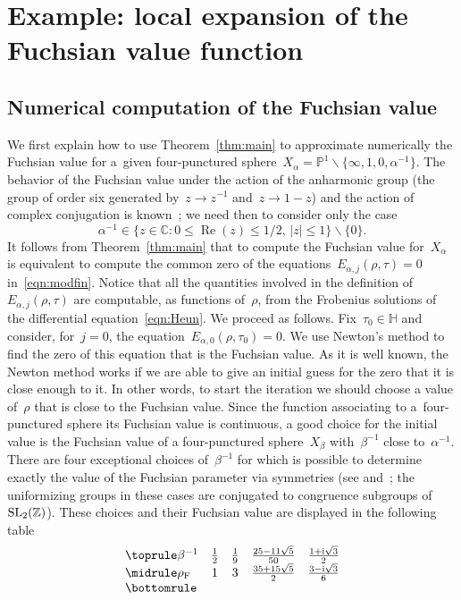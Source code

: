 \documentclass[pdftex]{sigma}
\newcommand{\Z}{\mathbb{Z}}
\newcommand{\C}{\mathbb{C}}
\newcommand{\pro}{\mathbb{P}}
\newcommand{\Po}{\mathbb{H}}
\numberwithin{equation}{section}
\begin{document}
\section{Example: local expansion of the Fuchsian value function}\label{sec:xpl}
\subsection{Numerical computation of the Fuchsian value}\label{sec:method}
We first explain how to use Theorem~\ref{thm:main} to approximate numerically the Fuchsian value for a~given four-punctured sphere~$X_\alpha=\pro^1\smallsetminus\big\{\infty,1,0,\alpha^{-1}\big\}$.
The behavior of the Fuchsian value under the action of the anharmonic group (the group of order six generated by~$z\to z^{-1}$ and~$z\to 1-z$) and the action of complex conjugation is known~\cite{KRV}; we need then to consider only the case
\[
\alpha^{-1}\in \{z\in\C\colon 0\le\operatorname{Re}(z)\le1/2,\,|z|\le1\}\smallsetminus\{0\} .
\]
It follows from Theorem~\ref{thm:main} that to compute the Fuchsian value for~$X_{\alpha}$ is equivalent to compute the common zero of the equations~$E_{\alpha,j}(\rho,\tau)=0$ in~\eqref{eqn:modfin}.
Notice that all the quantities involved in the definition of~$E_{\alpha,j}(\rho,\tau)$ are computable, as functions of~$\rho$, from the Frobenius solutions of the differential equation~\eqref{eqn:Heun}.
We proceed as follows. Fix~$\tau_0\in\Po$ and consider, for~$j=0$, the equation~$E_{\alpha,0}(\rho,\tau_0)=0$. We use Newton's method to find the zero of this equation that is the Fuchsian value. As it is well known, the Newton method works if we are able to give an initial guess for the zero that it is close enough to it. In other words, to start the iteration we should choose a value of~$\rho$ that is close to the Fuchsian value.
Since the function associating to a~four-punctured sphere its Fuchsian value is continuous, a good choice for the initial value is the Fuchsian value of a four-punctured sphere~$X_\beta$ with~$\beta^{-1}$ close to~$\alpha^{-1}$.
There are four exceptional choices of~$\beta^{-1}$ for which is possible to determine exactly the value of the Fuchsian parameter via symmetries (see \cite[Section~7]{Hempel} and~\cite{ZagApery}; the uniformizing groups in these cases are conjugated to congruence subgroups of~${\rm SL}_2(\Z)$). These choices and their Fuchsian value are displayed in the following table
$$
\begin{array}{lcccc}
\toprule
\beta^{-1} & \frac{1}{2} & \frac{1}{9} & \frac{25-11\sqrt{5}}{50} & \frac{1+{\rm i}\sqrt{3}}{2} \\
\midrule
\rho_{\rm F} & 1 & 3 & \frac{35+15\sqrt{5}}{2} & \frac{3-{\rm i}\sqrt{3}}{6} \\
\bottomrule
\end{array}
$$
\end{document}
